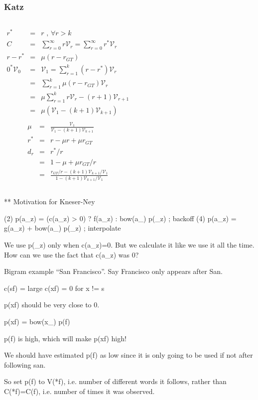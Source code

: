 \documentclass[ignorenonframetext]{beamer}
\newcommand{\vocab}{\mathcal{V}}
\begin{document}
\begin{frame}\frametitle{Katz}
\begin{columns}[t]
\begin{eqnarray*}
r^* &=& r \mbox{ , } \forall r>k \\
C &=& \sum_{r=0}^{\infty} r\vocab_r = \sum_{r=0}^{\infty} r^*\vocab_r \\
r-r^* &=& \mu (r-r_{GT}) \\
0^* \vocab_0 &=& \vocab_1 = \sum_{r=1}^k (r-r^*)\vocab_r \\
&=& \sum_{r=1}^k \mu (r-r_{GT})\vocab_r \\
&=& \mu \sum_{r=1}^k r\vocab_r - (r+1)\vocab_{r+1} \\
&=& \mu (\vocab_1 - (k+1)\vocab_{k+1}) \\
\end{eqnarray*}
\begin{eqnarray*}
\mu &=& \frac{\vocab_1}{\vocab_1 - (k+1)\vocab_{k+1}} \\
r^* &=& r - \mu r + \mu r_{GT} \\
d_r &=& r^*/r \\
&=& 1 - \mu + \mu r_{GT}/r \\
&=& \frac{r_{GT}/r - (k+1)\vocab_{k+1}/\vocab_1}{1 - (k+1)\vocab_{k+1}/\vocab_1}
\end{eqnarray*}
\end{columns}
\end{frame}

** Motivation for Kneser-Ney

       (2)  p(a_z) = (c(a_z) > 0) ? f(a_z) : bow(a_) p(_z)   ; backoff
       (4)  p(a_z) = g(a_z) + bow(a_) p(_z)   ; interpolate

We use p(_z) only when c(a_z)=0.  But we calculate it like we use it
all the time.  How can we use the fact that c(a_z) was 0?

Bigram example ``San Francisco''.  Say Francisco only appears after San.

c(sf) = large
c(xf) = 0 for x != s

p(xf) should be very close to 0.

p(xf) = bow(x_) p(f)

p(f) is high, which will make p(xf) high!

We should have estimated p(f) as low since it is only going to be used
if not after following san.

So set p(f) to V(*f), i.e. number of different words it follows,
rather than C(*f)=C(f), i.e. number of times it was observed.
\end{document}
